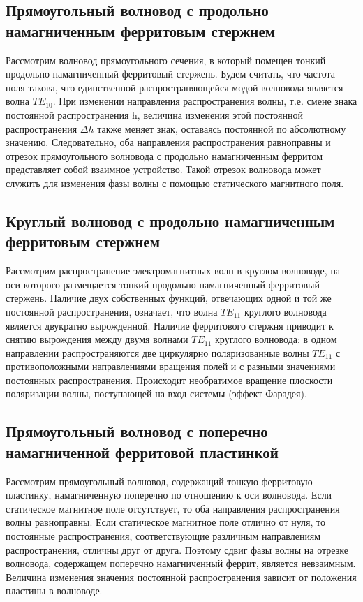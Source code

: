\subsection{Прямоугольный волновод с продольно намагниченным ферритовым стержнем}
Рассмотрим волновод прямоугольного сечения, в который помещен тонкий продольно намагниченный ферритовый стержень. Будем считать, что частота поля такова, что единственной распространяющейся модой волновода является волна $TE_{10}$. При изменении направления распространения волны, т.е. смене знака постоянной распространения h, величина изменения этой постоянной распространения $\Delta h$ также меняет знак, оставаясь постоянной по абсолютному значению. Следовательно, оба направления распространения равноправны и отрезок прямоугольного волновода с продольно намагниченным ферритом представляет собой взаимное устройство. Такой отрезок волновода может служить для изменения фазы волны с помощью статического магнитного поля.
\subsection{Круглый волновод с продольно намагниченным ферритовым стержнем}
Рассмотрим распространение электромагнитных волн в круглом волноводе, на оси которого размещается тонкий продольно намагниченный ферритовый стержень. Наличие двух собственных функций, отвечающих одной и той же постоянной распространения, означает, что волна $TE_{11}$ круглого волновода является двукратно вырожденной. Наличие ферритового стержня приводит к снятию вырождения между двумя волнами $TE_{11}$ круглого волновода: в одном направлении распространяются две циркулярно поляризованные волны $TE_{11}$ с противоположными направлениями вращения полей и с разными значениями постоянных распространения. Происходит необратимое вращение плоскости поляризации волны, поступающей на вход системы (эффект Фарадея).
\subsection{Прямоугольный волновод с поперечно намагниченной ферритовой пластинкой}
Рассмотрим прямоугольный волновод, содержащий тонкую ферритовую пластинку, намагниченную поперечно по отношению к оси волновода. Если статическое магнитное поле отсутствует, то оба направления распространения волны равноправны. Если статическое магнитное поле отлично от нуля, то постоянные распространения, соответствующие различным направлениям распространения, отличны друг от друга. Поэтому сдвиг фазы волны на отрезке волновода, содержащем поперечно намагниченный феррит, является невзаимным. Величина изменения значения постоянной распространения зависит от положения пластины в волноводе. 

